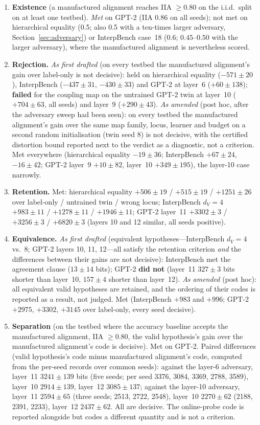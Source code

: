\documentclass[11pt,a4paper]{article}
\newcommand{\dv}{d_V}
\begin{document}
\begin{enumerate}
\item \textbf{Existence} (a manufactured alignment reaches IIA $\ge0.80$ on the i.i.d.\ split on at least one testbed). \emph{Met} on GPT-2 (IIA 0.86 on all seeds); not met on hierarchical equality (0.5; also 0.5 with a ten-times larger adversary, Section~\ref{sec:adversary}) or InterpBench case~18 (0.6; $0.45$--$0.50$ with the larger adversary), where the manufactured alignment is nevertheless scored.
\item \textbf{Rejection.} \emph{As first drafted} (on every testbed the manufactured alignment's gain over label-only is not decisive): held on hierarchical equality ($-571\pm20$), InterpBench ($-437\pm31$, $-430\pm33$) and GPT-2 at layer~6 ($+60\pm138$); \textbf{failed} for the coupling map on the untrained GPT-2 twin at layer~10 ($+704\pm63$, all seeds) and layer~9 ($+290\pm43$). \emph{As amended} (post hoc, after the adversary sweep had been seen): on every testbed the manufactured alignment's gain over the same map family, locus, learner and budget on a second random initialisation (twin seed 8) is not decisive, with the certified distortion bound reported next to the verdict as a diagnostic, not a criterion. Met everywhere (hierarchical equality $-19\pm36$; InterpBench $+67\pm24$, $-16\pm42$; GPT-2 layer~9 $+10\pm82$, layer~10 $+349\pm195$), the layer-10 case narrowly.
\item \textbf{Retention.} Met: hierarchical equality $+506\pm19$ / $+515\pm19$ / $+1251\pm26$ over label-only / untrained twin / wrong locus; InterpBench $\dv=4$ $+983\pm11$ / $+1278\pm11$ / $+1946\pm11$; GPT-2 layer~11 $+3302\pm3$ / $+3256\pm3$ / $+6820\pm3$ (layers 10 and 12 similar, all seeds positive).
\item \textbf{Equivalence.} \emph{As first drafted} (equivalent hypotheses---InterpBench $\dv=4$ vs.\ 8; GPT-2 layers 10, 11, 12---all satisfy the retention criterion \emph{and} the differences between their gains are not decisive): InterpBench met the agreement clause ($13\pm14$ bits); GPT-2 \textbf{did not} (layer~11 $327\pm3$ bits shorter than layer~10, $157\pm4$ shorter than layer~12). \emph{As amended} (post hoc): all equivalent valid hypotheses are retained, and the ordering of their codes is reported as a result, not judged. Met (InterpBench $+983$ and $+996$; GPT-2 $+2975$, $+3302$, $+3145$ over label-only, every seed decisive).
\item \textbf{Separation} (on the testbed where the accuracy baseline accepts the manufactured alignment, IIA $\ge0.80$, the valid hypothesis's gain over the manufactured alignment's code is decisive). Met on GPT-2. Paired differences (valid hypothesis's code minus manufactured alignment's code, computed from the per-seed records over common seeds): against the layer-6 adversary, layer~11 $3241\pm139$ bits (five seeds; per seed 3376, 3084, 3369, 2788, 3589), layer~10 $2914\pm139$, layer~12 $3085\pm137$; against the layer-10 adversary, layer~11 $2594\pm65$ (three seeds; 2513, 2722, 2548), layer~10 $2270\pm62$ (2188, 2391, 2233), layer~12 $2437\pm62$. All are decisive. The online-probe code is reported alongside but codes a different quantity and is not a criterion.
\end{enumerate}
\end{document}
